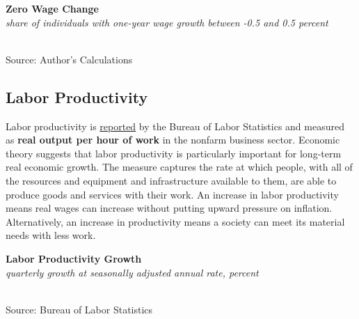 \documentclass{report}
\makeatletter
\newcommand{\tbllink}[1]{\href{https://raw.githubusercontent.com/bdecon/US-chartbook/master/chartbook/data/#1}{\faTable}}
\newcommand*\short[1]{\expandafter\@gobbletwo\number\numexpr#1\relax}
\newcommand{\sbar}[4]{
		\addplot[ybar stacked, bar width=2.45pt, draw opacity=0, fill=#1] 
			table [x=#2, y=#3, col sep=comma]{#4};}
\newcommand{\dateaxisticks}{
		date coordinates in=x, axis line style={draw=none},
		xmax={2022-03-15},
		max space between ticks=40,	    
		xtick={{1990-01-01}, {1992-01-01}, {1994-01-01}, 
			{1996-01-01}, {1998-01-01}, {2000-01-01}, 
			{2002-01-01}, {2004-01-01}, {2006-01-01},
			{2008-01-01}, {2010-01-01}, {2012-01-01}, {2014-01-01},
		    {2016-01-01}, {2018-01-01}, {2020-01-01}, {2022-01-01}, 
		    {2024-01-01}, {2026-01-01}},
		minor xtick={{1989-01-01}, {1991-01-01}, {1993-01-01},
			{1995-01-01}, {1997-01-01}, {1999-01-01}, 
			{2001-01-01}, {2003-01-01}, {2005-01-01}, {2007-01-01},
		    {2009-01-01}, {2011-01-01}, {2013-01-01}, {2015-01-01},
		    {2017-01-01}, {2019-01-01}, {2021-01-01}, {2023-01-01}, 
		    {2025-01-01}, {2027-01-01}},
		enlarge y limits={0.06}, enlarge x limits={0.01},
		}
\newcommand{\bbar}[2]{extra #1 ticks = {{#2}}, extra #1 tick labels = ,
		extra #1 tick style = {grid=major, grid style={thick, black!25}},}
\newcommand{\stdline}[4]{\addplot[very thick, no markers, color=#1] 
		table [x=#2, y=#3, col sep=comma] {#4};	}
\newcommand{\rbars}{
		\fill[color=black!10] (axis cs:{1990-07-01},\pgfkeysvalueof{/pgfplots/ymin}) rectangle 
			(axis cs:{1991-03-01}, \pgfkeysvalueof{/pgfplots/ymax});
		\fill[color=black!10] (axis cs:{2007-12-01},\pgfkeysvalueof{/pgfplots/ymin}) rectangle 
			(axis cs:{2009-07-01}, \pgfkeysvalueof{/pgfplots/ymax});
		\fill[color=black!10] (axis cs:{2001-03-01},\pgfkeysvalueof{/pgfplots/ymin}) rectangle 
			(axis cs:{2001-11-01}, \pgfkeysvalueof{/pgfplots/ymax});
		\fill[color=black!10] (axis cs:{2020-02-01},\pgfkeysvalueof{/pgfplots/ymin}) rectangle 
			(axis cs:{2020-05-01}, \pgfkeysvalueof{/pgfplots/ymax});}
\newcommand{\rebars}{
		\fill[color=black!10] (axis cs:{2007-12-01},\pgfkeysvalueof{/pgfplots/ymin}) rectangle 
			(axis cs:{2009-07-01}, \pgfkeysvalueof{/pgfplots/ymax});
		\fill[color=black!10] (axis cs:{2001-03-01},\pgfkeysvalueof{/pgfplots/ymin}) rectangle 
			(axis cs:{2001-11-01}, \pgfkeysvalueof{/pgfplots/ymax});
		\fill[color=black!10] (axis cs:{2020-02-01},\pgfkeysvalueof{/pgfplots/ymin}) rectangle 
			(axis cs:{2020-05-01}, \pgfkeysvalueof{/pgfplots/ymax});}
\makeatother
\begin{document}
{{\begin{minipage}{0.76\textwidth}

\vspace{1mm}

\normalsize \textbf{Zero Wage Change}\\
\footnotesize{\textit{share of individuals with one-year wage growth between -0.5 and 0.5 percent}}\\
\hspace*{-2mm} \\
\footnotesize{Source: Author's Calculations} \hfill \tbllink{atl_wgt.csv}
\end{minipage}
\newpage
\begin{minipage}{0.76\textwidth}
\subsection*{Labor Productivity}
\hypertarget{labprod}{}
\small Labor productivity is \href{https://www.bls.gov/news.release/prod2.nr0.htm}{reported} by the Bureau of Labor Statistics and measured as \textbf{real output per hour of work} in the nonfarm business sector. Economic theory suggests that labor productivity is particularly important for long-term real economic growth. The measure captures the rate at which people, with all of the resources and equipment and infrastructure available to them, are able to produce goods and services with their work. An increase in labor productivity means real wages can increase without putting upward pressure on inflation. Alternatively, an increase in productivity means a society can meet its material needs with less work.


\vspace{3mm}

\normalsize \textbf{Labor Productivity Growth}\\
\footnotesize{\textit{quarterly growth at seasonally adjusted annual rate, percent}}\\
\hspace*{-2mm} \\
\footnotesize{Source: Bureau of Labor Statistics} \hfill \tbllink{lprod.csv}
\vspace{3mm}


\end{minipage}}}
\end{document}
